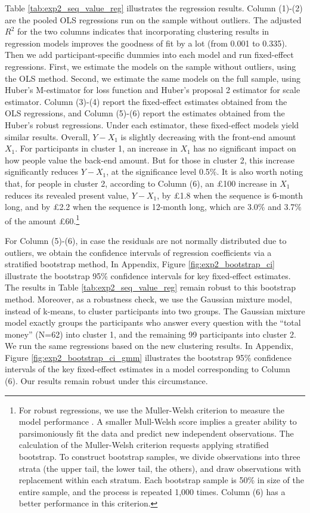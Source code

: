 \documentclass[
  12pt,
]{article}
\begin{document}


Table \ref{tab:exp2_seq_value_reg} illustrates the regression results.
Column (1)-(2) are the pooled OLS regressions run on the sample without
outliers. The adjusted \(R^2\) for the two columns indicates that
incorporating clustering results in regression models improves the
goodness of fit by a lot (from 0.001 to 0.335). Then we add
participant-specific dummies into each model and run fixed-effect
regressions. First, we estimate the models on the sample without
outliers, using the OLS method. Second, we estimate the same models on
the full sample, using Huber's M-estimator for loss function and Huber's
proposal 2 estimator for scale estimator. Column (3)-(4) report the
fixed-effect estimates obtained from the OLS regressions, and Column
(5)-(6) report the estimates obtained from the Huber's robust
regressions. Under each estimator, these fixed-effect models yield
similar results. Overall, \(Y-X_1\) is slightly decreasing with the
front-end amount \(X_1\). For participants in cluster 1, an increase in
\(X_1\) has no significant impact on how people value the back-end
amount. But for those in cluster 2, this increase significantly reduces
\(Y-X_1\), at the significance level 0.5\%. It is also worth noting
that, for people in cluster 2, according to Column (6), an £100 increase
in \(X_1\) reduces its revealed present value, \(Y-X_1\), by £1.8 when
the sequence is 6-month long, and by £2.2 when the sequence is 12-month
long, which are 3.0\% and 3.7\% of the amount £60.\footnote{For robust
  regressions, we use the Muller-Welsh criterion to measure the model
  performance \citep{muller2005outlier}. A smaller Mull-Welsh score
  implies a greater ability to parsimoniously fit the data and predict
  new independent observations. The calculation of the Muller-Welsh
  criterion requests applying stratified bootstrap. To construct
  bootstrap samples, we divide observations into three strata (the upper
  tail, the lower tail, the others), and draw observations with
  replacement within each stratum. Each bootstrap sample is 50\% in size
  of the entire sample, and the process is repeated 1,000 times. Column
  (6) has a better performance in this criterion.}

For Column (5)-(6), in case the residuals are not normally distributed
due to outliers, we obtain the confidence intervals of regression
coefficients via a stratified bootstrap method, In Appendix, Figure
\ref{fig:exp2_bootstrap_ci} illustrate the bootstrap 95\% confidence
intervals for key fixed-effect estimates. The results in Table
\ref{tab:exp2_seq_value_reg} remain robust to this bootstrap method.
Moreover, as a robustness check, we use the Gaussian mixture model,
instead of k-means, to cluster participants into two groups. The
Gaussian mixture model exactly groups the participants who answer every
question with the ``total money'' (N=62) into cluster 1, and the
remaining 99 participants into cluster 2. We run the same regressions
based on the new clustering results. In Appendix, Figure
\ref{fig:exp2_bootstrap_ci_gmm} illustrates the bootstrap 95\%
confidence intervals of the key fixed-effect estimates in a model
corresponding to Column (6). Our results remain robust under this
circumstance.
\end{document}

